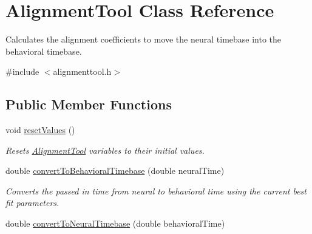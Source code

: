 \hypertarget{class_alignment_tool}{\section{Alignment\-Tool Class Reference}
\label{class_alignment_tool}
}


Calculates the alignment coefficients to move the neural timebase into the behavioral timebase.  




{\ttfamily \#include $<$alignmenttool.\-h$>$}

\subsection*{Public Member Functions}
\begin{DoxyCompactItemize}
\item 
\hypertarget{class_alignment_tool_ad29f55cfe853cdce46f0bc1ccc5df709}{void \hyperlink{class_alignment_tool_ad29f55cfe853cdce46f0bc1ccc5df709}{reset\-Values} ()}\label{class_alignment_tool_ad29f55cfe853cdce46f0bc1ccc5df709}

\begin{DoxyCompactList}\small\item\em Resets \hyperlink{class_alignment_tool}{Alignment\-Tool} variables to their initial values. \end{DoxyCompactList}\item 
\hypertarget{class_alignment_tool_ae9caea7d9dbaf480b6545df6634c6e10}{double \hyperlink{class_alignment_tool_ae9caea7d9dbaf480b6545df6634c6e10}{convert\-To\-Behavioral\-Timebase} (double neural\-Time)}\label{class_alignment_tool_ae9caea7d9dbaf480b6545df6634c6e10}

\begin{DoxyCompactList}\small\item\em Converts the passed in time from neural to behavioral time using the current best fit parameters. \end{DoxyCompactList}\item 
\hypertarget{class_alignment_tool_ae3896af2cf346ba9d090896be7bb5feb}{double \hyperlink{class_alignment_tool_ae3896af2cf346ba9d090896be7bb5feb}{convert\-To\-Neural\-Timebase} (double behavioral\-Time)}\label{class_alignment_tool_ae3896af2cf346ba9d090896be7bb5feb}


\end{DoxyCompactItemize}
